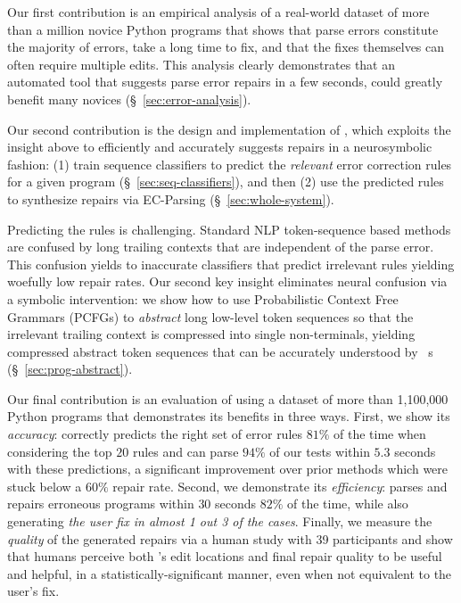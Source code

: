 %
Our first contribution is an empirical analysis of a real-world
dataset of more than a million novice Python programs that shows
that parse errors constitute the majority of errors, take a long
time to fix, and that the fixes themselves can often require
multiple edits.
%
This analysis clearly demonstrates that an automated tool that
suggests parse error repairs in a few seconds, could greatly
benefit many novices (\S~\ref{sec:error-analysis}).

%
Our second contribution is the design and implementation
of \toolname, which exploits the insight above to
efficiently and accurately suggests repairs in a
neurosymbolic fashion:
%
(1) train sequence classifiers to predict the \emph{relevant}
error correction rules for a given program (\S~\ref{sec:seq-classifiers}), and then
%
(2) use the predicted rules to synthesize repairs
via EC-Parsing (\S~\ref{sec:whole-system}).

%
Predicting the rules is challenging.
Standard NLP token-sequence based
methods are confused by long
trailing contexts that are
independent of the parse error.
%
This confusion yields to inaccurate
classifiers that predict irrelevant
rules yielding woefully low repair rates.
%
Our second key insight eliminates neural confusion
via a symbolic intervention: we show how to use
Probabilistic Context Free Grammars (PCFGs)
to \emph{abstract} long low-level token
sequences so that the irrelevant trailing
context is compressed into single non-terminals,
yielding compressed abstract token sequences
that can be accurately understood by \dnn~s
(\S~\ref{sec:prog-abstract}).

%
Our final contribution is an evaluation of \toolname
using a dataset of more than 1,100,000 Python programs
that demonstrates its benefits in three ways.
%
First, we show its \emph{accuracy}: \toolname correctly predicts
the right set of error rules $81\%$ of the time when considering the top $20$
rules and can parse $94\%$ of our tests within $5.3$ seconds with these
predictions, a significant improvement over prior methods
which were stuck below a $60\%$ repair rate.
%
Second, we demonstrate its \emph{efficiency}: \toolname
parses and repairs erroneous programs within $30$ seconds $82\%$ of the time,
while also generating \emph{the user fix in almost 1 out 3 of the cases}.
%
Finally, we measure the \emph{quality} of the generated repairs via a human study
with 39 participants and show that humans perceive both \toolname's edit
locations and final repair quality to be useful and helpful,
in a statistically-significant manner, even when not equivalent to the user's fix.


